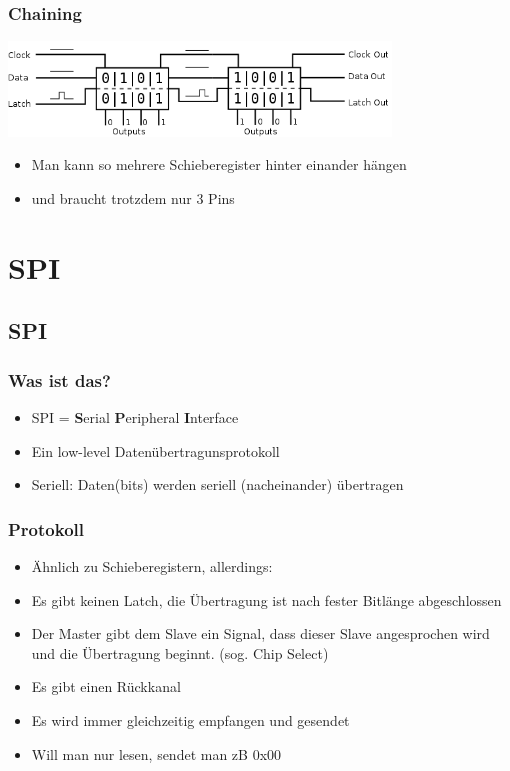 \documentclass[ngerman,compress]{beamer}
\begin{document}
\begin{frame} [fragile]
	\frametitle{Chaining}
	\includegraphics[width=4in]{15_latch.png}
	\begin{itemize}
		\item Man kann so mehrere Schieberegister hinter einander hängen
                \item und braucht trotzdem nur 3 Pins
	\end{itemize}
\end{frame}



\section{SPI}


\subsection{SPI}

\begin{frame} [fragile]
	\frametitle{Was ist das?}
	\begin{itemize}
		\item SPI = \textbf{S}erial \textbf{P}eripheral \textbf{I}nterface
		\item Ein low-level Datenübertragunsprotokoll
		\item Seriell: Daten(bits) werden seriell (nacheinander) übertragen
	\end{itemize}
\end{frame}

\begin{frame} [fragile]
	\frametitle{Protokoll}
	\begin{itemize}
		\item Ähnlich zu Schieberegistern, allerdings:
		\item Es gibt keinen Latch, die Übertragung ist nach fester Bitlänge abgeschlossen
		\item Der Master gibt dem Slave ein Signal, dass dieser Slave angesprochen wird
			und die Übertragung beginnt. (sog. Chip Select)
		\item Es gibt einen Rückkanal
		\item Es wird immer gleichzeitig empfangen und gesendet
		\item Will man nur lesen, sendet man zB 0x00
	\end{itemize}
\end{frame}
\end{document}
